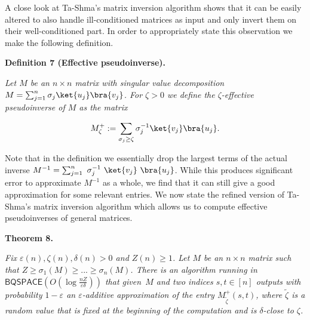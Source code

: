 \documentclass[10pt,a4paper]{article}
\begin{document}
A close look at Ta-Shma’s matrix inversion algorithm shows that it can be easily altered to also handle ill-conditioned matrices as input and only invert them on their well-conditioned part.
In order to appropriately state this observation we make the following definition.\par





\par\medskip\noindent\textbf{
\textbf{Definition 7}\textbf{ }(Effective pseudoinverse)\textbf{.}
}\par



\emph{Let $M$ be an $n\times n$ matrix with singular value decomposition $M=\sum_{j=1}^{n}\sigma_{j}\ket{u_{j}}\bra{v_{j}}$. For $\zeta>0$ we define the $\zeta$-effective pseudoinverse of $M$ as the matrix}\par


\[\begin{gathered}
\displaystyle M_{\zeta}^{+}:=\sum_{\sigma_{j}\geq\zeta}\sigma_{j}^{-1}\ket{v_{j}}\bra{u_{j}}.
\end{gathered}\]






Note that in the definition we essentially drop the largest terms of the actual inverse $M^{-1}=\sum_{j=1}^{n}\nobreak\ \sigma_{j}^{-1}\nobreak\ \ket{v_{j}}\nobreak\ \bra{u_{j}}$.
While this produces significant error to approximate $M^{-1}$ as a whole, we find that it can still give a good approximation for some relevant entries. We now state the refined version of Ta-Shma’s matrix inversion algorithm which allows us to compute effective pseudoinverses of general matrices.\par





\par\medskip\noindent\textbf{
\textbf{Theorem 8}\textbf{.}
}\par



\emph{Fix $\varepsilon(n),\zeta(n),\delta(n)>0$ and $Z(n)\geq 1$.
Let $M$ be an $n\times n$ matrix such that $Z\geq\sigma_{1}(M)\geq...\geq\sigma_{n}(M)$.
There is an algorithm running in $\mathsf{BQSPACE}(O(\log\frac{nZ}{\varepsilon\delta}))$ that given $M$ and two indices $s,t\in[n]$ outputs with probability $1-\varepsilon$ an $\varepsilon$-additive approximation of the entry $M_{\widetilde{\zeta}}^{+}(s,t)$,
where $\widetilde{\zeta}$ is a random value that is fixed at the beginning of the computation and is $\delta$-close to $\zeta$.}\par
\end{document}
